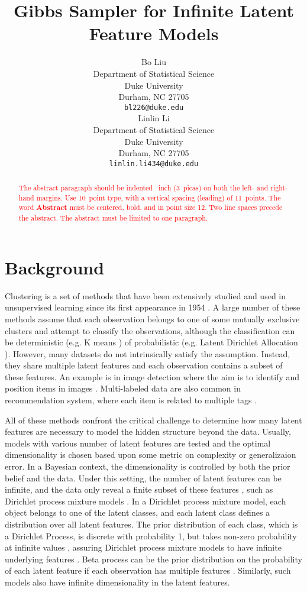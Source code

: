 \documentclass{article}
\title{Gibbs Sampler for Infinite Latent Feature Models}
\author{%
  Bo Liu \\
  Department of Statistical Science\\
  Duke University\\
  Durham, NC 27705 \\
  \texttt{bl226@duke.edu} \\
  \And
  Linlin Li \\
  Department of Statistical Science\\
  Duke University\\
  Durham, NC 27705 \\
  \texttt{linlin.li434@duke.edu} \\
}
\begin{document}
\maketitle

\begin{abstract}
  \textcolor{red}{The abstract paragraph should be indented ~inch (3~picas) on
  both the left- and right-hand margins. Use 10~point type, with a vertical
  spacing (leading) of 11~points.  The word \textbf{Abstract} must be centered,
  bold, and in point size 12. Two line spaces precede the abstract. The abstract
  must be limited to one paragraph.}
\end{abstract}

\section{Background}

Clustering is a set of methods that have been extensively studied and used in unsupervised learning since its first appearance in 1954 \citep{caron2018deep}. A large number of these methods assume that each observation belongs to one of some mutually exclusive clusters and attempt to classify the observations, although the classification can be deterministic (e.g. K means \citep{steinhaus1956division, lloyd1982least}) of probabilistic (e.g. Latent Dirichlet Allocation \citep{blei2003latent}). However, many datasets do not intrinsically satisfy the assumption. Instead, they share multiple latent features and each observation contains a subset of these features. An example is in image detection where the aim is to identify and position items in images \citep{zhang2018multilabel}. Multi-labeled data are also common in recommendation system, where each item is related to multiple tags \citep{zheng2014context}.

All of these methods confront the critical challenge to determine how many latent features are necessary to model the hidden structure beyond the data. Usually, models with various number of latent features are tested and the optimal dimensionality is chosen based upon some metric on complexity or generalizaion error. In a Bayesian context, the dimensionality is controlled by both the prior belief and the data. Under this setting, the number of latent features can be infinite, and the data only reveal a finite subset of these features \citep{rasmussen2001occam}, such as Dirichlet process mixture models \citep{antoniak1974mixtures}. In a Dirichlet process mixture model, each object belongs to one of the latent classes, and each latent class defines a distribution over all latent features. The prior distribution of each class, which is a Dirichlet Process, is discrete with probability 1, but takes non-zero probability at infinite values \citep{teh2010dirichlet}, assuring Dirichlet process mixture models to have infinite underlying features \citep{rasmussen2000infinite}. Beta process can be the prior distribution on the probability of each latent feature if each observation has multiple features \citep{JMLR:v12:griffiths11a}. Similarly, such models also have infinite dimensionality in the latent features.
\end{document}
